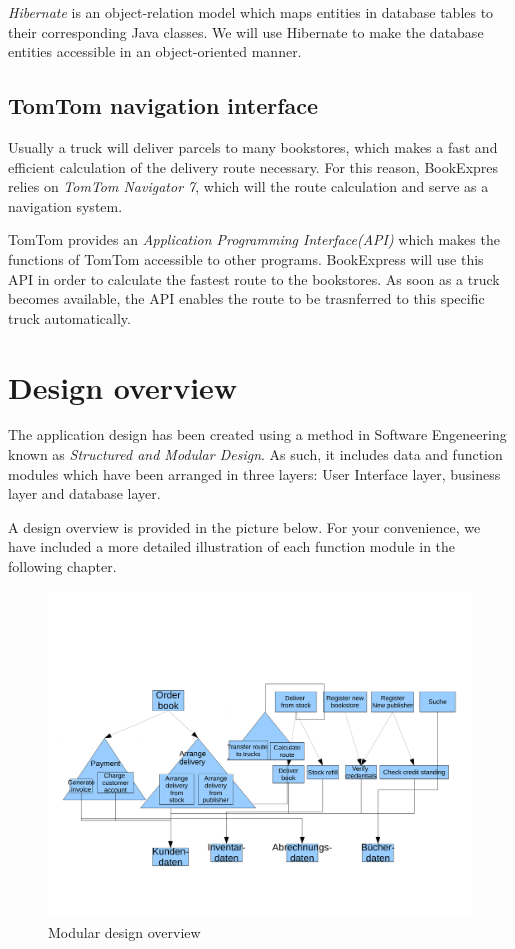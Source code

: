 \emph{Hibernate} is an object-relation model which maps entities in database tables to their corresponding Java classes. We will use Hibernate to make the database entities accessible in an object-oriented manner.
\section{TomTom navigation interface}
Usually a truck will deliver parcels to many bookstores, which makes a fast and efficient calculation of the delivery route necessary. For this reason, BookExpres relies on \emph{TomTom Navigator 7}, which will the route calculation and serve as a navigation system.

TomTom provides an \emph{Application Programming Interface(API)} which makes the functions of TomTom accessible to other programs. BookExpress will use this API in order to calculate the fastest route to the bookstores. As soon as a truck becomes available, the API enables the route to be trasnferred to this specific truck automatically.
\chapter{Design overview}
The application design has been created using a method in Software Engeneering known as \emph{Structured and Modular Design}. As such, it includes data and function modules which have been arranged in three layers: User Interface layer, business layer and database layer.

A design overview is provided in the picture below. For your convenience, we have included a more detailed illustration of each function module in the following chapter.

\begin{figure}[H]
\centering
\includegraphics[scale=0.5]{design.pdf}
\caption{Modular design overview}
\end{figure}

